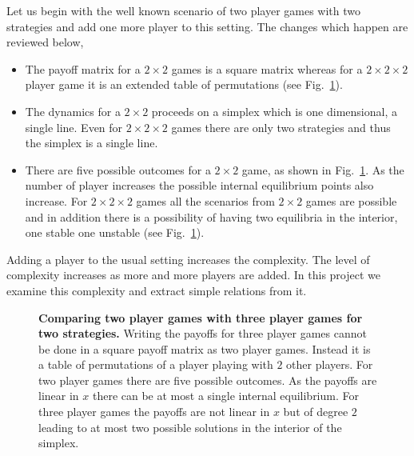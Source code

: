 \documentclass[oneside,11pt,a4paper]{book}
\begin{document}
Let us begin with the well known scenario of two player games with two strategies and add one more player to this setting.
The changes which happen are reviewed below,

\begin{itemize}
\item The payoff matrix for a $2 \times 2$ games is a square matrix whereas for a $2 \times 2 \times 2$ player game it is an extended table of permutations (see Fig.\ \ref{fig:general2by2by2}).
\item The dynamics for a $2 \times 2$ proceeds on a simplex which is one dimensional, a single line.
	Even for $2 \times 2 \times 2$ games there are only two strategies and thus the simplex is a single line.
\item There are five possible outcomes for a $2 \times 2$ game, as shown in Fig.\ \ref{fig:general2by2by2}.
As the number of player increases the possible internal equilibrium points also increase.
For $2 \times 2 \times 2$ games all the scenarios from $2 \times 2$ games are possible and in addition there is a possibility of having two equilibria in the interior, one stable one unstable (see Fig.\ \ref{fig:general2by2by2}).
\end{itemize}
%
Adding a player to the usual setting increases the complexity.
The level of complexity increases as more and more players are added.
In this project we examine this complexity and extract simple relations from it.
%
\begin{figure}[!h]
  \begin{center}
    \caption{\textbf{Comparing two player games with three player games for two strategies.}
   \small{Writing the payoffs for three player games cannot be done in a square payoff matrix as two player games.
   Instead it is a table of permutations of a player playing with $2$ other players.
   For two player games there are five possible outcomes.
   As the payoffs are linear in $x$ there can be at most a single internal equilibrium.
   For three player games the payoffs are not linear in $x$ but of degree $2$ leading to at most two possible solutions in the interior of the simplex.}}
    \label{fig:general2by2by2}
  \end{center}
\end{figure}
%
\end{document}
